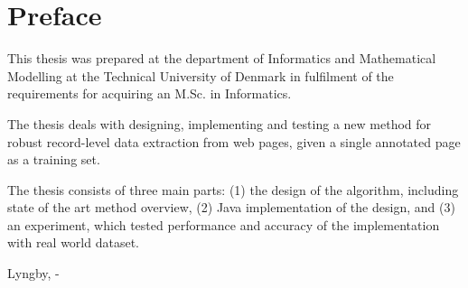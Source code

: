 \chapter{Preface}

This thesis was prepared at the department of Informatics and Mathematical Modelling at the Technical University of Denmark in fulfilment of the requirements for acquiring an M.Sc. in Informatics.

The thesis deals with designing, implementing and testing a new method for robust record-level data extraction from web pages, given a single annotated page as a training set.

The thesis consists of three main parts: (1) the design of the algorithm, including state of the art method overview, (2) Java implementation of the design, and (3) an experiment, which tested performance and accuracy of the implementation with real world dataset.

\vspace{20mm}
\begin{center}
    \hspace{20mm} Lyngby, \thesishandin-\thesisyear
    \vspace{5mm}
    \newline
\end{center}
\begin{flushright}
    \thesisauthor
\end{flushright}

